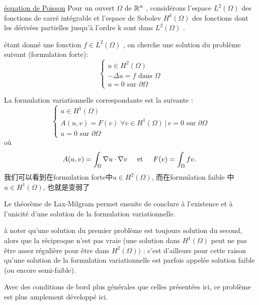 \underline{\'equation de Poisson}\newline
Pour un ouvert $ \Omega$  de $ \mathbb{R}^n$ , consid\'erons l'espace $ L^2(\Omega) $ des fonctions de carr\'e int\'egrable et l'espace de Sobolev $ H^k(\Omega)$  des fonctions dont les d\'eriv\'ees partielles jusqu'\`a l'ordre k sont dans $ L^2(\Omega)$ .

\'etant donn\'e une fonction $ f \in L^2(\Omega)$ , on cherche une solution du probl\`eme suivant (formulation forte):
\begin{equation}
    \begin{cases} u \in H^2(\Omega) \\ -\Delta u = f \text{ dans } \Omega \\ u = 0 \text{ sur } \partial\Omega \end{cases}
\end{equation}

La formulation variationnelle correspondante est la suivante :
\begin{equation}
    \begin{cases} u \in H^1(\Omega) \\ A(u,v) = F(v) \; \forall v \in H^1(\Omega) \, | \, v = 0 \text{ sur } \partial\Omega \\ u = 0 \text{ sur } \partial\Omega \end{cases}
\end{equation}
où
$$
A(u,v) = \int_\Omega \nabla u \cdot \nabla v \hspace{0.5cm} \text{et} \hspace{0.5cm} F(v) = \int_\Omega fv.~
$$
我们可以看到在formulation forte中$u \in H^2(\Omega)$, 而在formulation faible 中$u \in H^1(\Omega)$, 也就是变弱了

Le th\'eor\`eme de Lax-Milgram permet ensuite de conclure \`a l'existence et \`a l'unicit\'e d'une solution de la formulation variationnelle.

\`a noter qu'une solution du premier probl\`eme est toujours solution du second, alors que la r\'eciproque n'est pas vraie (une solution dans $  H^1(\Omega)$   peut ne pas \^etre assez r\'eguli\`ere pour \^etre dans $  H^2(\Omega)) $  : c'est d'ailleurs pour cette raison qu'une solution de la formulation variationnelle est parfois appel\'ee solution faible (ou encore semi-faible).

Avec des conditions de bord plus g\'en\'erales que celles pr\'esent\'ees ici, ce probl\`eme est plus amplement d\'evelopp\'e ici.

